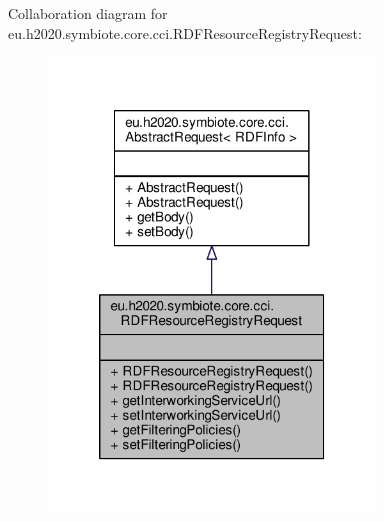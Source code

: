 Collaboration diagram for eu.\+h2020.\+symbiote.\+core.\+cci.\+R\+D\+F\+Resource\+Registry\+Request\+:\nopagebreak
\begin{figure}[H]
\begin{center}
\leavevmode
\includegraphics[width=246pt]{classeu_1_1h2020_1_1symbiote_1_1core_1_1cci_1_1RDFResourceRegistryRequest__coll__graph}
\end{center}
\end{figure}
